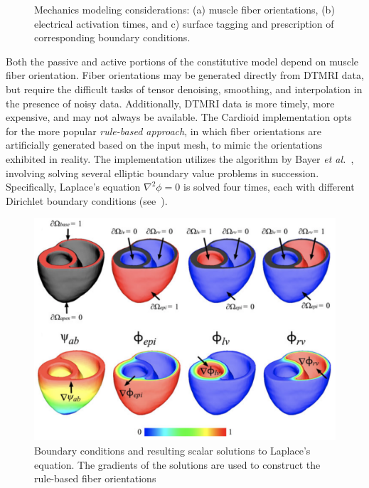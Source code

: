 \begin{figure}[ht]
{\label{fig:supp3}}
%
\caption{Mechanics modeling considerations: (a) muscle fiber orientations, (b) electrical activation times, and c) surface tagging and prescription of corresponding boundary conditions.}
\label{fig:supp}
\end{figure}

Both the passive and active portions of the constitutive model depend on muscle fiber orientation. Fiber orientations may be generated directly from DTMRI data, but require the difficult tasks of tensor denoising, smoothing, and interpolation in the presence of noisy data. Additionally, DTMRI data is more timely, more expensive, and may not always be available. The Cardioid implementation opts for the more popular \textit{rule-based approach}, in which fiber orientations are artificially generated based on the input mesh, to mimic the orientations exhibited in reality. The implementation utilizes the algorithm by Bayer \textit{et al.}~\cite{bayer_2012}, involving solving several elliptic boundary value problems in succession. Specifically, Laplace's equation $\nabla^2\phi = 0$ is solved four times, each with different Dirichlet boundary conditions (see~).

\begin{figure}[ht]
\centering
		\includegraphics[scale=0.3]{media/bayer.png}
\caption{Boundary conditions and resulting scalar solutions to Laplace's equation. The gradients of the solutions are used to construct the rule-based fiber orientations~\cite{bayer_2012}}
\label{fig:bayer}
\end{figure}

